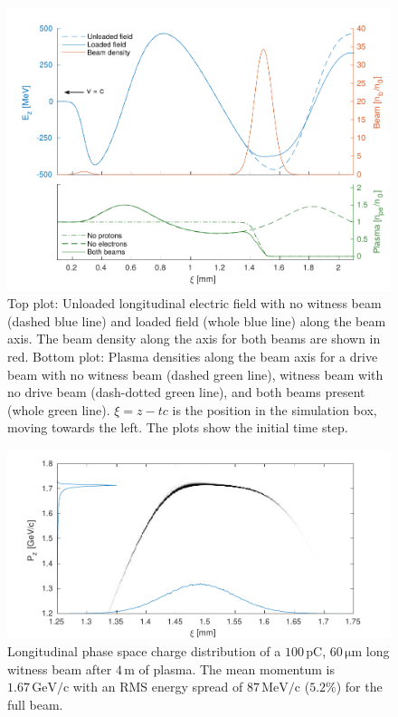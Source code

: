 \documentclass[aps,prstab,reprint,amsmath,amssymb,groupedaddress]{revtex4-1}
\newcommand{\unit}[1]{\,\mathrm{#1}}
\begin{document}
\begin{figure}[hbt]
    \includegraphics[width=\linewidth,trim={2mm 0mm 2mm 0mm},clip]{figures/beamLoading}
    \caption{\label{Fig:BeamLoading} Top plot: Unloaded longitudinal electric field with no witness beam
        (dashed blue line) and loaded field (whole blue line) along the beam axis. The beam density along the axis for
        both beams are shown in red.
        Bottom plot: Plasma densities along the beam axis for a drive beam with no witness beam (dashed green line),
        witness beam with no drive beam (dash-dotted green line), and both beams present (whole green line).
        $\xi = z - tc$ is the position in the simulation box, moving towards the left. The plots show the initial time
        step.}
\end{figure}

\begin{figure}[hbt]
    \includegraphics[width=\linewidth,trim={2mm 0mm 2mm 0mm},clip]{figures/beamPhaseSpace}
    \caption{\label{Fig:BeamPS} Longitudinal phase space charge distribution of a $100\unit{pC}$, $60\unit{\mu m}$ long
        witness beam after $4\unit{m}$ of plasma. The mean momentum is $1.67\unit{GeV/c}$ with an RMS energy spread
        of $87\unit{MeV/c}$ ($5.2\%$) for the full beam.}
\end{figure}
\end{document}
